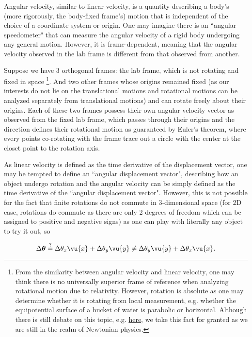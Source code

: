 \documentclass[a4paper,12pt]{report}
\begin{document}
Angular velocity, similar to linear velocity, is a quantity describing a body's (more rigorously, the body-fixed frame's) motion that is independent of the choice of a coordinate system or origin. One may imagine there is an ``angular-speedometer" that can measure the angular velocity of a rigid body undergoing any general motion. However, it is frame-dependent, meaning that the angular velocity observed in the lab frame is different from that observed from another. 

Suppose we have 3 orthogonal frames: the lab frame, which is not rotating and fixed in space \footnote{From the similarity between angular velocity and linear velocity, one may think there is no universally superior frame of reference when analyzing rotational motion due to relativity. However, rotation is absolute as one may determine whether it is rotating from local measurement, e.g. whether the equipotential surface of a bucket of water is parabolic or horizontal. Although there is still debate on this topic, e.g. \href{https://en.wikipedia.org/wiki/Mach\%27s_principle}{here}, we take this fact for granted as we are still in the realm of Newtonian physics.}. And two other frames whose origins remained fixed (as our interests do not lie on the translational motions and rotational motions can be analyzed separately from translational motions) and can rotate freely about their origins. Each of these two frames possess their own angular velocity vector as observed from the fixed lab frame, which passes through their origins and the direction defines their rotational motion as guaranteed by Euler's theorem, where every points co-rotating with the frame trace out a circle with the center at the closet point to the rotation axis.

As linear velocity is defined as the time derivative of the displacement vector, one may be tempted to define an ``angular displacement vector", describing how an object undergo rotation and the angular velocity can be simply defined as the time derivative of the ``angular displacement vector". However, this is not possible for the fact that finite rotations do not commute in 3-dimensional space (for 2D case, rotations do commute as there are only 2 degrees of freedom which can be assigned to positive and negative signs) as one can play with literally any object to try it out, so 

\begin{equation}
	\Delta \boldsymbol{\theta } \stackrel{?}{=} \Delta \theta_{x} \vu{x} + \Delta \theta_{y} \vu{y} \neq \Delta \theta_{y} \vu{y} + \Delta \theta_{x } \vu{x} . 
\end{equation}
\end{document}
